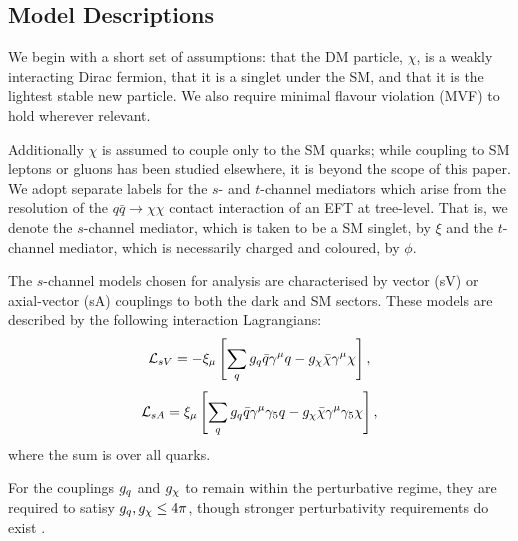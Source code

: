 \subsection{Model Descriptions}
We begin with a short set of assumptions: that the DM particle, $\chi$, is a weakly interacting Dirac fermion, that it is a singlet under the SM, and that it is the lightest stable new particle. We also require minimal flavour violation (MVF) to hold wherever relevant.

Additionally $\chi$ is assumed to couple only to the SM quarks; while coupling to SM leptons \cite{} or gluons \cite{} has been studied elsewhere, it is beyond the scope of this paper. We adopt separate labels for the $s$- and $t$-channel mediators which arise from the resolution of the $q\bar q \rightarrow \chi \chi$ contact interaction of an EFT at tree-level. That is, we denote the $s$-channel mediator, which is taken to be a SM singlet, by $\xi$ and the $t$-channel mediator, which is necessarily charged and coloured, by $\phi$.

The $s$-channel models chosen for analysis are characterised by vector (sV) or axial-vector (sA) couplings to both the dark and SM sectors. 
These models are described by the following interaction Lagrangians:
\begin{equation}
\label{L_int_sV}
\mathcal{L}_{sV} = - \xi_{\mu}\left[ \sum\limits_{q} g_q\bar{q}\gamma^{\mu}q - g_{\chi}\bar{\chi}\gamma^{\mu}\chi\right],
\end{equation}
\begin{equation}
\label{L_int_sA}
\mathcal{L}_{sA} =  \xi_{\mu}\left[\sum\limits_{q} g_q\bar{q}\gamma^{\mu}\gamma_{5}q - g_{\chi}\bar{\chi}\gamma^{\mu}\gamma_{5}\chi\right],
\end{equation}
where the sum is over all quarks.

For the couplings $g_q$ and $g_{\chi}$ to remain within the perturbative regime, they are required to satisy $g_q,g_{\chi} \leq 4\pi$, though stronger perturbativity requirements do exist \cite{ValidEFT}.

